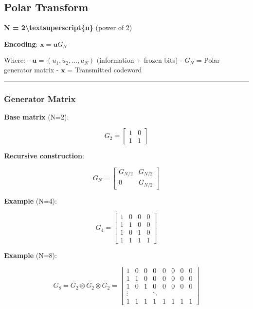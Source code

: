\subsection{Polar Transform}\label{polar-transform}

\textbf{N = 2\textbackslash textsuperscript\{n\}} (power of 2)

\textbf{Encoding}: \(\mathbf{x} = \mathbf{u} G_N\)

Where: - \(\mathbf{u}\) = \((u_1, u_2, \ldots, u_N)\) (information +
frozen bits) - \(G_N\) = Polar generator matrix - \(\mathbf{x}\) =
Transmitted codeword

\begin{center}\rule{0.5\linewidth}{0.5pt}\end{center}

\subsubsection{Generator Matrix}\label{generator-matrix}

\textbf{Base matrix} (N=2):

\[
G_2 = \begin{bmatrix} 1 & 0 \\ 1 & 1 \end{bmatrix}
\]

\textbf{Recursive construction}:

\[
G_N = \begin{bmatrix} G_{N/2} & G_{N/2} \\ 0 & G_{N/2} \end{bmatrix}
\]

\textbf{Example} (N=4):

\[
G_4 = \begin{bmatrix}
1 & 0 & 0 & 0 \\
1 & 1 & 0 & 0 \\
1 & 0 & 1 & 0 \\
1 & 1 & 1 & 1
\end{bmatrix}
\]

\textbf{Example} (N=8):

\[
G_8 = G_2 \otimes G_2 \otimes G_2 = \begin{bmatrix}
1 & 0 & 0 & 0 & 0 & 0 & 0 & 0 \\
1 & 1 & 0 & 0 & 0 & 0 & 0 & 0 \\
1 & 0 & 1 & 0 & 0 & 0 & 0 & 0 \\
\vdots & & & \ddots & & & & \\
1 & 1 & 1 & 1 & 1 & 1 & 1 & 1
\end{bmatrix}
\]


